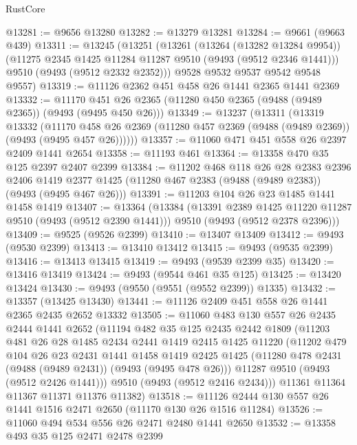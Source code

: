 \begin{lexlean}{RustCore}
\begin{coremodule}
@13281 := @9656 @13280
@13282 := @13279 @13281
@13284 := @9661 (@9663 @439)
@13311 := @13245
    (@13251
      (@13261
        (@13264 (@13282 @13284 @9954))
        (@11275 @2345 @1425 @11284 @11287 @9510 (@9493 (@9512 @2346 @1441)))
        @9510
        (@9493 (@9512 @2332 @2352)))
      @9528
      @9532
      @9537
      @9542
      @9548
      @9557)
@13319 := @11126 @2362 @451 @458 @26 @1441 @2365 @1441 @2369
@13332 := @11170 @451 @26 @2365 (@11280 @450 @2365 (@9488 (@9489 @2365)) (@9493 (@9495 @450 @26)))
@13349 := @13237
    (@13311
      (@13319
        @13332
        (@11170 @458 @26 @2369 (@11280 @457 @2369 (@9488 (@9489 @2369)) (@9493 (@9495 @457 @26))))))
@13357 := @11060 @471 @451 @558 @26 @2397 @2409 @1441 @2654
@13358 := @11193 @461
@13364 := @13358 @470 @35 @125 @2397 @2407 @2399
@13384 := @11202
    @468
    @118
    @26
    @28
    @2383
    @2396
    @2406
    @1419
    @2377
    @1425
    (@11280 @467 @2383 (@9488 (@9489 @2383)) (@9493 (@9495 @467 @26)))
@13391 := @11203 @104 @26 @23 @1485 @1441 @1458 @1419
@13407 := @13364
    (@13384
      (@13391 @2389 @1425 @11220 @11287 @9510 (@9493 (@9512 @2390 @1441)))
      @9510
      (@9493 (@9512 @2378 @2396)))
@13409 := @9525 (@9526 @2399)
@13410 := @13407 @13409
@13412 := @9493 (@9530 @2399)
@13413 := @13410 @13412
@13415 := @9493 (@9535 @2399)
@13416 := @13413 @13415
@13419 := @9493 (@9539 @2399 @35)
@13420 := @13416 @13419
@13424 := @9493 (@9544 @461 @35 @125)
@13425 := @13420 @13424
@13430 := @9493 (@9550 (@9551 (@9552 @2399)) @1335)
@13432 := @13357 (@13425 @13430)
@13441 := @11126 @2409 @451 @558 @26 @1441 @2365 @2435 @2652 @13332
@13505 := @11060
    @483
    @130
    @557
    @26
    @2435
    @2444
    @1441
    @2652
    (@11194
      @482
      @35
      @125
      @2435
      @2442
      @1809
      (@11203
        @481
        @26
        @28
        @1485
        @2434
        @2441
        @1419
        @2415
        @1425
        @11220
        (@11202
          @479
          @104
          @26
          @23
          @2431
          @1441
          @1458
          @1419
          @2425
          @1425
          (@11280 @478 @2431 (@9488 (@9489 @2431)) (@9493 (@9495 @478 @26)))
          @11287
          @9510
          (@9493 (@9512 @2426 @1441)))
        @9510
        (@9493 (@9512 @2416 @2434)))
      @11361
      @11364
      @11367
      @11371
      @11376
      @11382)
@13518 := @11126 @2444 @130 @557 @26 @1441 @1516 @2471 @2650 (@11170 @130 @26 @1516 @11284)
@13526 := @11060 @494 @534 @556 @26 @2471 @2480 @1441 @2650
@13532 := @13358 @493 @35 @125 @2471 @2478 @2399

\end{coremodule}
\end{lexlean}

